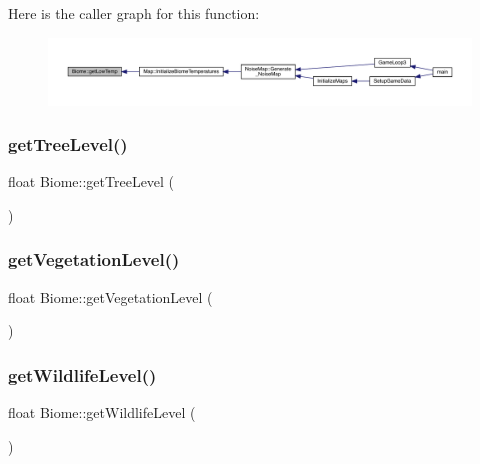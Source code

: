Here is the caller graph for this function\+:
\nopagebreak
\begin{figure}[H]
\begin{center}
\leavevmode
\includegraphics[width=350pt]{d6/dd0/class_biome_a198f0bb873cce52c8e62df2cf0282e84_icgraph}
\end{center}
\end{figure}
\mbox{\label{class_biome_a052e0b1b6a6167f3e076a64a59487172}} 
\subsubsection{\texorpdfstring{get\+Tree\+Level()}{getTreeLevel()}}
{\footnotesize\ttfamily float Biome\+::get\+Tree\+Level (\begin{DoxyParamCaption}{ }\end{DoxyParamCaption})}

\mbox{\label{class_biome_a93767d0c392cdef6c3c527a4dbe38efd}} 
\subsubsection{\texorpdfstring{get\+Vegetation\+Level()}{getVegetationLevel()}}
{\footnotesize\ttfamily float Biome\+::get\+Vegetation\+Level (\begin{DoxyParamCaption}{ }\end{DoxyParamCaption})}

\mbox{\label{class_biome_aaa9ebdc0dde9b6737da890299a7b5ea4}} 
\subsubsection{\texorpdfstring{get\+Wildlife\+Level()}{getWildlifeLevel()}}
{\footnotesize\ttfamily float Biome\+::get\+Wildlife\+Level (\begin{DoxyParamCaption}{ }\end{DoxyParamCaption})}

